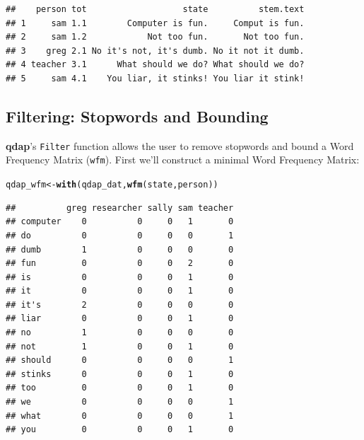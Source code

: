 \documentclass{article}\usepackage[]{graphicx}\usepackage[]{color}
\makeatletter
\newcommand{\hlstd}[1]{\textcolor[rgb]{0.345,0.345,0.345}{#1}}%
\newcommand{\hlkwb}[1]{\textcolor[rgb]{0.69,0.353,0.396}{#1}}%
\newcommand{\hlkwd}[1]{\textcolor[rgb]{0.737,0.353,0.396}{\textbf{#1}}}%
\newenvironment{kframe}{%
 \def\at@end@of@kframe{}%
 \ifinner\ifhmode%
  \def\at@end@of@kframe{\end{minipage}}%
  \begin{minipage}{\columnwidth}%
 \fi\fi%
 \def\FrameCommand##1{\hskip\@totalleftmargin \hskip-\fboxsep
 \colorbox{shadecolor}{##1}\hskip-\fboxsep
     \hskip-\linewidth \hskip-\@totalleftmargin \hskip\columnwidth}%
 \MakeFramed {\advance\hsize-\width
   \@totalleftmargin\z@ \linewidth\hsize
   \@setminipage}}%
 {\par\unskip\endMakeFramed%
 \at@end@of@kframe}
\newenvironment{knitrout}{}{} %
\makeatother
\begin{document}
\begin{knitrout}
\color{fgcolor}\begin{kframe}
\begin{verbatim}
##    person tot                   state          stem.text
## 1     sam 1.1        Computer is fun.     Comput is fun.
## 2     sam 1.2            Not too fun.       Not too fun.
## 3    greg 2.1 No it's not, it's dumb. No it not it dumb.
## 4 teacher 3.1      What should we do? What should we do?
## 5     sam 4.1    You liar, it stinks! You liar it stink!
\end{verbatim}
\end{kframe}
\end{knitrout}



\subsection{Filtering: Stopwords and Bounding}
    

\textbf{qdap}'s \texttt{Filter} function allows the user to remove stopwords and bound a Word Frequency Matrix (\texttt {wfm}).  First we'll construct a minimal Word Frequency Matrix:

\begin{knitrout}
\color{fgcolor}\begin{kframe}
\begin{alltt}
\hlstd{qdap_wfm} \hlkwb{<-} \hlkwd{with}\hlstd{(qdap_dat,} \hlkwd{wfm}\hlstd{(state, person))}
\end{alltt}
\end{kframe}
\end{knitrout}


\begin{knitrout}
\color{fgcolor}\begin{kframe}
\begin{verbatim}
##          greg researcher sally sam teacher
## computer    0          0     0   1       0
## do          0          0     0   0       1
## dumb        1          0     0   0       0
## fun         0          0     0   2       0
## is          0          0     0   1       0
## it          0          0     0   1       0
## it's        2          0     0   0       0
## liar        0          0     0   1       0
## no          1          0     0   0       0
## not         1          0     0   1       0
## should      0          0     0   0       1
## stinks      0          0     0   1       0
## too         0          0     0   1       0
## we          0          0     0   0       1
## what        0          0     0   0       1
## you         0          0     0   1       0
\end{verbatim}
\end{kframe}
\end{knitrout}
\end{document}
